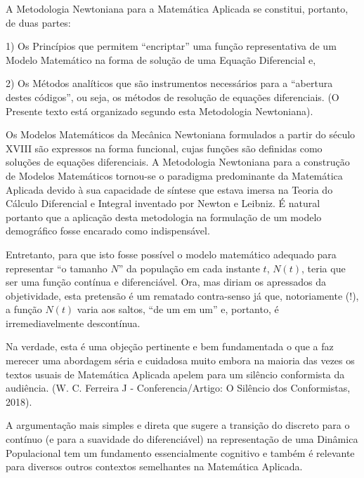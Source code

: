     A Metodologia Newtoniana para a Matemática Aplicada se constitui, portanto, de duas partes: 

    1) Os Princípios que permitem ``encriptar'' uma função representativa de um Modelo Matemático na forma de solução de uma Equação Diferencial e,
    
    2) Os Métodos analíticos que são instrumentos necessários para a ``abertura destes códigos'', ou seja, os métodos de resolução de equações diferenciais. (O Presente texto está organizado segundo esta Metodologia Newtoniana).

    Os Modelos Matemáticos da Mecânica Newtoniana formulados a partir do século XVIII são expressos na forma funcional, cujas funções são definidas como soluções de equações diferenciais. A Metodologia Newtoniana para a construção de Modelos Matemáticos tornou-se o paradigma predominante da Matemática Aplicada devido à sua capacidade de síntese que estava imersa na Teoria do Cálculo Diferencial e Integral inventado por Newton e Leibniz. É natural portanto que a aplicação desta metodologia na formulação de um modelo demográfico fosse encarado como indispensável.

    Entretanto, para que isto fosse possível o modelo matemático adequado para representar ``o tamanho \(N\)'' da população em cada instante \(t\), \(N(t)\), teria que ser uma função contínua e diferenciável. Ora, mas diriam os apressados da objetividade, esta pretensão é um rematado contra-senso já que, notoriamente (!), a função \(N(t)\) varia aos saltos, ``de um em um'' e, portanto, é irremediavelmente descontínua. 

    Na verdade, esta é uma objeção pertinente e bem fundamentada o que a faz merecer uma abordagem séria e cuidadosa muito embora na maioria das vezes os textos usuais de Matemática Aplicada apelem para um silêncio conformista da audiência. (W. C. Ferreira J - Conferencia/Artigo: O Silêncio dos Conformistas, 2018).
    
    A argumentação mais simples e direta que sugere a transição do discreto para o contínuo (e para a suavidade do diferenciável) na representação de uma Dinâmica Populacional tem um fundamento essencialmente cognitivo e também é relevante para diversos outros contextos semelhantes na Matemática Aplicada.
    
